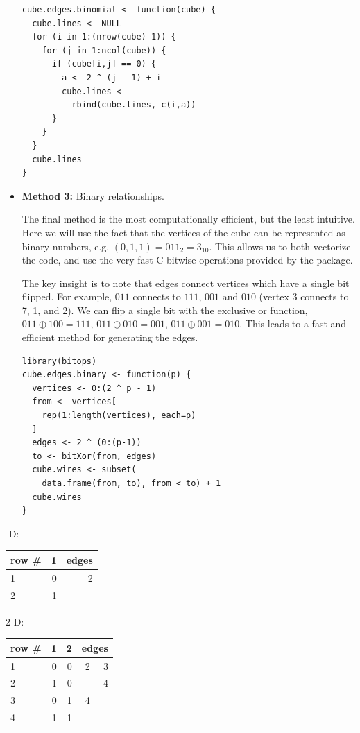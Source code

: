 \documentclass[a4paper]{report}
\begin{document}
\begin{article}
\begin{itemize}
\begin{verbatim}
cube.edges.binomial <- function(cube) {
  cube.lines <- NULL
  for (i in 1:(nrow(cube)-1)) {
    for (j in 1:ncol(cube)) {
      if (cube[i,j] == 0) {
        a <- 2 ^ (j - 1) + i
        cube.lines <- 
          rbind(cube.lines, c(i,a))
      }
    }
  }
  cube.lines
}
\end{verbatim}

  \item {\bf Method 3:} Binary relationships.
  
    The final method is the most computationally efficient, but the
    least intuitive. Here we will use the fact that the vertices of
    the cube can be represented as binary numbers, e.g.  $(0, 1, 1) =
    011_2 = 3_{10}$. This allows us to both vectorize the code, and
    use the very fast C bitwise operations provided by the
     package.

    The key insight is to note that edges connect vertices which have
    a single bit flipped. For example, $011$ connects to $111$, $001$
    and $010$ (vertex 3 connects to 7, 1, and 2). We can flip a single
    bit with the exclusive or function, $011 \oplus 100 = 111$, $011
    \oplus 010 = 001$, $011 \oplus 001 = 010$.  This leads to a fast
    and efficient method for generating the edges.

\begin{verbatim}
library(bitops)
cube.edges.binary <- function(p) {
  vertices <- 0:(2 ^ p - 1)
  from <- vertices[
    rep(1:length(vertices), each=p)
  ]
  edges <- 2 ^ (0:(p-1))
  to <- bitXor(from, edges)
  cube.wires <- subset(
    data.frame(from, to), from < to) + 1
  cube.wires
} 
\end{verbatim}

\end{itemize}

\begin{table}[htp]
  -D:
\bigskip

\begin{tabular}{|l ||r|| r|}
\hline
row \# & 1 & edges \\
\hline
1 & 0 & 2\\
\hline
2 & 1 & \\
\hline
\end{tabular}
\bigskip

2-D:
\bigskip

\begin{tabular}{|l ||r|r|| r r|}
\hline
row \# & 1 & 2 & \multicolumn{2}{c|}{edges} \\
\hline
1 & 0 & 0 & 2 & 3\\
\hline
2 & 1 & 0 &  & 4 \\
\hline
3 & 0 & 1 &  4 & \\
\hline
4 & 1 & 1 &  & \\
\hline
\end{tabular}


\end{table}
\end{article}
\end{document}
